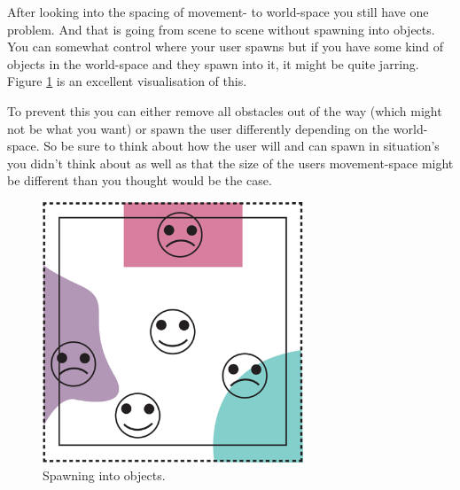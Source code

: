 \documentclass{report}
\begin{document}
				After looking into the spacing of movement- to world-space you still have one problem. And that is going from scene to scene without spawning into objects. You can somewhat control where your user spawns but if you have some kind of objects in the world-space and they spawn into it, it might be quite jarring. Figure \ref{fig:area_object} is an excellent visualisation of this. 
				
				To prevent this you can either remove all obstacles out of the way (which might not be what you want) or spawn the user differently depending on the world-space. So be sure to think about how the user will and can spawn in situation's you didn't think about as well as that the size of the users movement-space might be different than you thought would be the case.
				
				\begin{figure}[h!]
					\centering
					\includegraphics[width=21em]{img/area_in_object.png}
					\caption{Spawning into objects.} 
					\label{fig:area_object}
				\end{figure}
				
\end{document}

